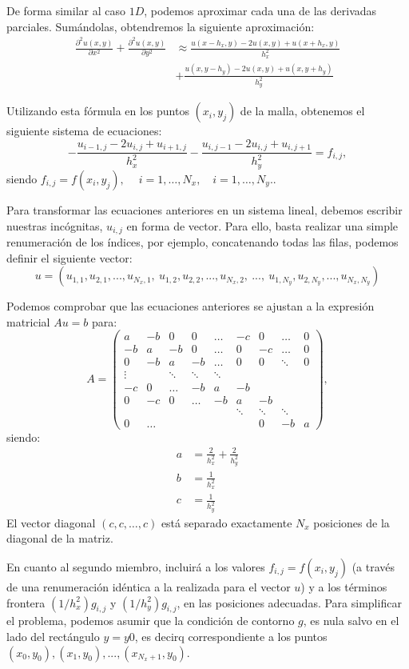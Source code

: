 \documentclass[11pt,spanish]{article}
\begin{document}
De forma similar al caso $1D$, podemos aproximar cada una de las
derivadas parciales. Sumándolas, obtendremos la siguiente aproximación:
\begin{align*}
  \frac{\partial^2 u(x,y) }{\partial x^2}
  +
  \frac{\partial^2 u(x,y)}{\partial y^2}
  & \approx \frac{u(x-h_x,y)-2u(x,y)+u(x+h_x,y)}{h_x^2}
  \\
  &+
  \frac{u(x,y-h_y)-2u(x,y)+u(x,y+h_y)}{h_y^2}
\end{align*}

Utilizando esta fórmula en los puntos $(x_i,y_j)$ de la malla,
obtenemos el siguiente sistema de ecuaciones:
$$
-\frac{u_{i-1,j}-2u_{i,j} + u_{i+1,j}}{h_x^2}
-\frac{u_{i,j-1}-2u_{i,j} + u_{i,j+1}}{h_y^2}
= f_{i,j},
$$
siendo $f_{i,j}=f(x_{i},y_j), \  \quad i=1,\dots,N_x,  \quad i=1,\dots,N_y.$.

Para transformar las ecuaciones anteriores en un sistema lineal,
debemos escribir nuestras incógnitas, $u_{i,j}$ en forma de
vector. Para ello, basta realizar una simple renumeración de los
índices, por ejemplo, concatenando todas las filas, podemos definir el
siguiente vector:
$$
u=(u_{1,1}, u_{2,1},...,u_{N_x,1},\ u_{1,2}, u_{2,2},...,u_{N_x,2},\
...,\ u_{1,N_y}, u_{2,N_y},...,u_{N_x,N_y})
$$


Podemos comprobar que las ecuaciones anteriores se ajustan a la expresión
matricial $Au=b$ para:
$$
A=
\begin{pmatrix}
   a & -b &  0 &  0 & \dots & -c & 0 & \dots & 0 \\
  -b &  a & -b &  0 & \dots & 0 & -c & \dots & 0\\
   0 & -b &  a & -b & \dots & 0 & 0 & \ddots & 0 \\
   \vdots &    & \ddots & \ddots & \ddots & \\
   -c & 0 & \dots & -b & a  & -b \\
   0 & -c &  0 & \dots & -b & a  & -b \\
     & & &&    & \ddots & \ddots & \ddots & \\
   0 & \dots & &  & & & 0 & -b & a
 \end{pmatrix},
$$
siendo:
\begin{align*}
  a&=\frac{2}{h_x^2}+\frac{2}{h_y^2} \\
  b&=\frac{1}{h_x^2} \\
  c&=\frac{1}{h_y^2}
\end{align*}
El vector diagonal $(c,c,\dots,c)$ está separado exactamente $N_x$
posiciones de la diagonal de la matriz.

En cuanto al segundo miembro, incluirá a los valores
$f_{i,j}=f(x_i,y_j)$ (a través de una renumeración idéntica a la
realizada para el vector $u$) y a los términos frontera
$(1/h_x^2)g_{i,j}$ y $(1/h_y^2)g_{i,j}$, en las posiciones adecuadas.
Para simplificar el problema, podemos asumir que la condición de
contorno $g$, es nula salvo en el lado del rectángulo $y=y0$, es
decirq correspondiente a los puntos
$(x_0,y_0), (x_1,y_0),...,(x_{N_x+1},y_0)$.
\end{document}
